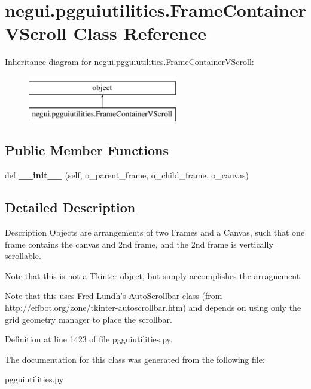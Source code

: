 \hypertarget{classnegui_1_1pgguiutilities_1_1FrameContainerVScroll}{}\section{negui.\+pgguiutilities.\+Frame\+Container\+V\+Scroll Class Reference}
\label{classnegui_1_1pgguiutilities_1_1FrameContainerVScroll}
Inheritance diagram for negui.\+pgguiutilities.\+Frame\+Container\+V\+Scroll\+:\begin{figure}[H]
\begin{center}
\leavevmode
\includegraphics[height=2.000000cm]{classnegui_1_1pgguiutilities_1_1FrameContainerVScroll}
\end{center}
\end{figure}
\subsection*{Public Member Functions}
\begin{DoxyCompactItemize}
\item 
def {\bfseries \+\_\+\+\_\+init\+\_\+\+\_\+} (self, o\+\_\+parent\+\_\+frame, o\+\_\+child\+\_\+frame, o\+\_\+canvas)\hypertarget{classnegui_1_1pgguiutilities_1_1FrameContainerVScroll_a77671bf20cb4175f0788de78bda3445f}{}\label{classnegui_1_1pgguiutilities_1_1FrameContainerVScroll_a77671bf20cb4175f0788de78bda3445f}

\end{DoxyCompactItemize}


\subsection{Detailed Description}
\begin{DoxyVerb}Description
Objects are arrangements of two Frames and a 
Canvas, such that one frame contains the 
canvas and 2nd frame, and the 2nd frame 
is vertically scrollable.

Note that this is not a Tkinter object, but
simply accomplishes the arragnement. 

Note that this uses Fred Lundh's AutoScrollbar class
(from http://effbot.org/zone/tkinter-autoscrollbar.htm)
and depends on using only the grid geometry manager to place
the scrollbar.
\end{DoxyVerb}
 

Definition at line 1423 of file pgguiutilities.\+py.



The documentation for this class was generated from the following file\+:\begin{DoxyCompactItemize}
\item 
pgguiutilities.\+py\end{DoxyCompactItemize}
